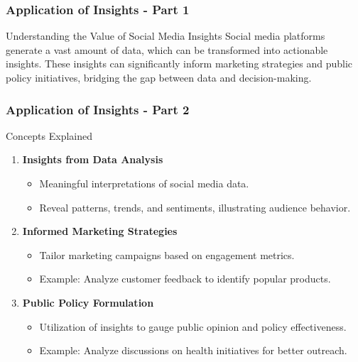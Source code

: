 \documentclass{beamer}
\begin{document}
\begin{frame}[fragile]
    \frametitle{Application of Insights - Part 1}
    \begin{block}{Understanding the Value of Social Media Insights}
        Social media platforms generate a vast amount of data, which can be transformed into actionable insights. 
        These insights can significantly inform marketing strategies and public policy initiatives, bridging the gap between data and decision-making.
    \end{block}
\end{frame}

\begin{frame}[fragile]
    \frametitle{Application of Insights - Part 2}
    \begin{block}{Concepts Explained}
        \begin{enumerate}
            \item \textbf{Insights from Data Analysis}
                \begin{itemize}
                    \item Meaningful interpretations of social media data.
                    \item Reveal patterns, trends, and sentiments, illustrating audience behavior.
                \end{itemize}
            \item \textbf{Informed Marketing Strategies}
                \begin{itemize}
                    \item Tailor marketing campaigns based on engagement metrics.
                    \item Example: Analyze customer feedback to identify popular products.
                \end{itemize}
            \item \textbf{Public Policy Formulation}
                \begin{itemize}
                    \item Utilization of insights to gauge public opinion and policy effectiveness.
                    \item Example: Analyze discussions on health initiatives for better outreach.
                \end{itemize}
        \end{enumerate}
    \end{block}
\end{frame}
\end{document}
